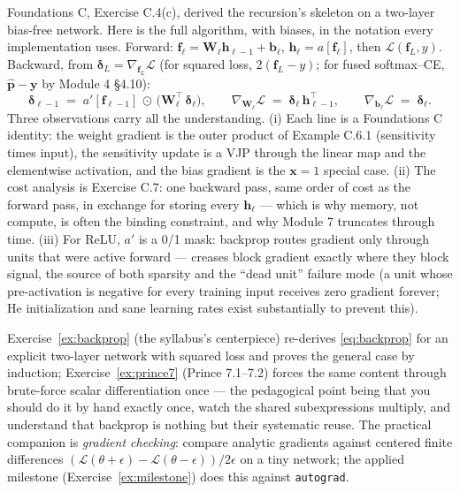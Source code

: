 \documentclass[11pt]{article}
\numberwithin{equation}{section}
\theoremstyle{plain}
\theoremstyle{definition}
\theoremstyle{remark}
\newcommand{\x}{\bm{x}}
\newcommand{\T}{\top}
\newcommand{\bh}{\bm{h}}
\newcommand{\bW}{\bm{W}}
\newcommand{\bb}{\bm{b}}
\newcommand{\bdelta}{\bm{\delta}}
\begin{document}
Foundations C, Exercise C.4(c), derived the recursion's skeleton on a two-layer bias-free network. Here is the full algorithm, with biases, in the notation every implementation uses. Forward: $\bm f_\ell = \bW_\ell \bh_{\ell - 1} + \bb_\ell$, $\bh_\ell = a[\bm f_\ell]$, then $\mathcal{L}(\bm f_L, y)$. Backward, from $\bdelta_L = \nabla_{\bm f_L}\mathcal{L}$ (for squared loss, $2(\bm f_L - y)$; for fused softmax--CE, $\hat{\bm p} - \bm y$ by Module 4 \S4.10):
\begin{equation}
\boxed{\;
\bdelta_{\ell-1} \;=\; a'[\bm f_{\ell-1}] \,\odot\, \big( \bW_\ell^\T\, \bdelta_\ell \big),
\qquad
\nabla_{\bW_\ell} \mathcal{L} \;=\; \bdelta_\ell\, \bh_{\ell-1}^\T,
\qquad
\nabla_{\bb_\ell} \mathcal{L} \;=\; \bdelta_\ell .
\;}
\label{eq:backprop}
\end{equation}
Three observations carry all the understanding. (i) Each line is a Foundations C identity: the weight gradient is the outer product of Example C.6.1 (sensitivity times input), the sensitivity update is a VJP through the linear map and the elementwise activation, and the bias gradient is the $\x = 1$ special case. (ii) The cost analysis is Exercise C.7: one backward pass, same order of cost as the forward pass, in exchange for storing every $\bh_\ell$ --- which is why memory, not compute, is often the binding constraint, and why Module 7 truncates through time. (iii) For ReLU, $a'$ is a 0/1 mask: backprop routes gradient only through units that were active forward --- creases block gradient exactly where they block signal, the source of both sparsity and the ``dead unit'' failure mode (a unit whose pre-activation is negative for every training input receives zero gradient forever; He initialization and sane learning rates exist substantially to prevent this).

Exercise~\ref{ex:backprop} (the syllabus's centerpiece) re-derives \eqref{eq:backprop} for an explicit two-layer network with squared loss and proves the general case by induction; Exercise~\ref{ex:prince7} (Prince 7.1--7.2) forces the same content through brute-force scalar differentiation once --- the pedagogical point being that you should do it by hand exactly once, watch the shared subexpressions multiply, and understand that backprop is nothing but their systematic reuse. The practical companion is \emph{gradient checking}: compare analytic gradients against centered finite differences $(\mathcal{L}(\theta + \epsilon) - \mathcal{L}(\theta - \epsilon))/2\epsilon$ on a tiny network; the applied milestone (Exercise~\ref{ex:milestone}) does this against \texttt{autograd}.
\end{document}
